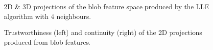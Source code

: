 \begin{figure}[H]
	\centering
	\caption{2D \& 3D projections of the blob feature space produced by the LLE algorithm with 4 neighbours.}\label{fig:blob_LLE_mapping}
\end{figure}
\clearpage

\clearpage
\begin{figure}[H]
	\centering
	\caption{Trustworthiness (left) and continuity (right) of the 2D projections produced from blob features.}\label{fig:TC_2d_blobs}
\end{figure}

